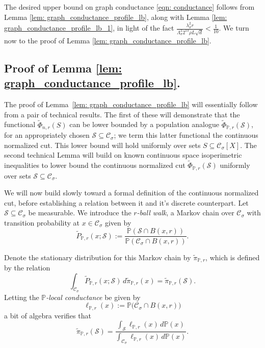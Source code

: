 \documentclass[11pt,twoside]{article}
\newcommand{\1}{\mathbf{1}}
\newcommand{\Pbb}{\mathbb{P}}
\newcommand{\Sset}{\mathcal{S}}
\newcommand{\Cset}{\mathcal{C}}
\newcommand{\Csig}{\Cset_{\sigma}}
\newcommand{\piwt}{\widetilde{\pi}}
\begin{document}
The desired upper bound on graph conductance \eqref{eqn: conductance} follows from Lemma \ref{lem: graph_conductance_profile_lb}, along with Lemma \ref{lem: graph_conductance_profile_lb_1}, in light of the fact $\frac{\lambda_{\sigma}^2 r}{\Lambda_{\sigma}^2 2^{13} \rho L \sqrt{d}} < \frac{1}{10}$. We turn now to the proof of Lemma \ref{lem: graph_conductance_profile_lb}.

\subsection{Proof of Lemma \ref{lem: graph_conductance_profile_lb}.}

The proof of Lemma~\ref{lem: graph_conductance_profile_lb} will essentially follow from a pair of technical results. The first of these will demonstrate that the functional $\widetilde{\Phi}_{n,r}(S)$ can be lower bounded by a population analogue $\widetilde{\Phi}_{\Pbb,r}(\Sset)$, for an appropriately chosen $\Sset \subseteq \Csig$; we term this latter functional the continuous normalized cut. This lower bound will hold uniformly over sets $S \subseteq \Csig[X]$. The second technical Lemma will build on known continuous space isoperimetric inequalities to lower bound the continuous normalized cut $\widetilde{\Phi}_{\Pbb,r}(\Sset)$ uniformly over sets $\Sset \subseteq \Csig$.

We will now build slowly toward a formal definition of the continuous normalized cut, before establishing a relation between it and it's discrete counterpart. Let $\Sset \subseteq \Csig$ be measurable. We introduce the \emph{$r$-ball walk}, a Markov chain over $\Csig$ with transition probability at $x \in \Csig$ given by 
\begin{equation*}
\widetilde{P}_{\Pbb,r}(x; \Sset) := \frac{\Pbb(\Sset \cap B(x,r))}{\Pbb(\Csig \cap B(x,r))}.
\end{equation*}

Denote the stationary distribution for this Markov chain by $\piwt_{\Pbb,r}$, which is defined by the relation
\begin{equation*}
\int_{\Csig} \widetilde{P}_{\Pbb,r}(x; \Sset) \,d \piwt_{\Pbb,r}(x) = \piwt_{\Pbb,r}(\Sset).
\end{equation*}
Letting the \emph{$\Pbb$-local conductance} be given by
\begin{equation*}
\ell_{\Pbb,r}(x) := \Pbb\bigl(\Csig \cap B(x,r)\bigr)
\end{equation*}
a bit of algebra verifies that
\begin{equation*}
\piwt_{\Pbb,r}(\Sset) = \frac{\int_{\Sset} \ell_{\Pbb,r}(x) \,d \Pbb(x) }{\int_{\Csig} \ell_{\Pbb,r}(x) \,d \Pbb(x)}.
\end{equation*}
\end{document}
